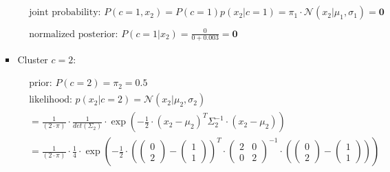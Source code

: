 \documentclass[12pt]{article}
\begin{document}
\begin{enumerate}
\begin{enumerate}[label=\arabic*)]
\begin{itemize}[label=]
\begin{equation*}
\begin{aligned}
                    \\    
                    &\text{joint probability: } P(c=1, x_2) =  P(c=1)p(x_2|c=1) = \pi_1 \cdot \mathcal{N}(x_2| \mu_1, \sigma_1) = \mathbf{0}\\
                    \\
                    &\text{normalized posterior: }P(c=1|x_2) = \frac{0}{0+0.003} = \mathbf{0}
                \end{aligned}
            \end{equation*}

            \newpage
            \item Cluster $c=2$:
            
            \begin{equation*}
                \begin{aligned}
                    &\text{prior: } P(c=2) = \pi_2 = \mathbf{0.5} \\
                    &\text{likelihood: } p(x_2|c=2) = \mathcal{N}(x_2| \mu_2, \sigma_2) \\
                    &= \frac{1}{(2 \cdot \pi)} \cdot \frac{1}{det(\Sigma_2)} \cdot \exp \left( -\frac{1}{2} \cdot (x_2 - \mu_2)^{T} \Sigma_2^{-1} \cdot (x_2 - \mu_2) \right)\\
                    &= \frac{1}{(2 \cdot \pi)} \cdot \frac{1}{4} \cdot \exp \left( -\frac{1}{2} \cdot \left(\begin{pmatrix}
                    0\\
                    2
                    \end{pmatrix} - \begin{pmatrix}
                    1\\
                    1
                    \end{pmatrix}\right)^{T} \cdot \begin{pmatrix}
                    2 & 0\\
                    0 & 2
                    \end{pmatrix}^{-1} \cdot \left(\begin{pmatrix}
                    0\\
                    2
                    \end{pmatrix} - \begin{pmatrix}
                    1\\
                    1
                    \end{pmatrix}\right) \right)\\

\end{aligned}
\end{equation*}
\end{itemize}
\end{enumerate}
\end{enumerate}
\end{document}
